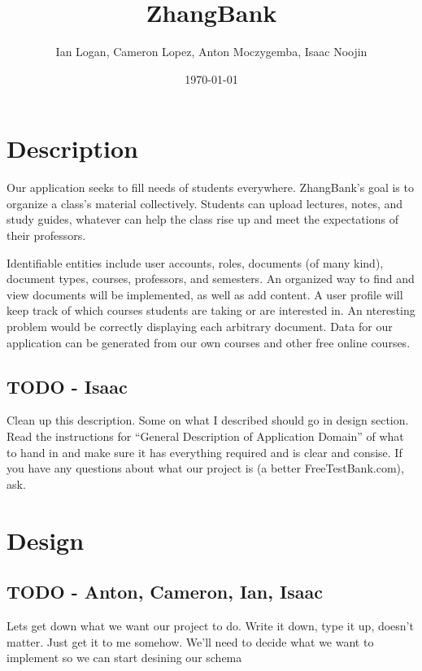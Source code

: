 \documentclass[11pt]{article}
\title{ZhangBank}
\author{Ian Logan, Cameron Lopez, Anton Moczygemba, Isaac Noojin}
\date{\today}
\begin{document}
\maketitle


\section*{Description}
\label{sec-1}


  Our application seeks to fill needs of students
  everywhere. ZhangBank's goal is to organize a class's material
  collectively. Students can upload lectures, notes, and study guides,
  whatever can help the class rise up and meet the expectations of
  their professors.

  Identifiable entities include user accounts, roles, documents (of
  many kind), document types, courses, professors, and semesters. An
  organized way to find and view documents will be implemented, as
  well as add content. A user profile will keep track of which courses
  students are taking or are interested in. An nteresting problem
  would be correctly displaying each arbitrary document. Data for our
  application can be generated from our own courses and other free
  online courses.
  
\subsection*{\textbf{TODO} - Isaac}
\label{sec-1-1}

   Clean up this description. Some on what I described should go in
   design section. Read the instructions for ``General Description of
   Application Domain'' of what to hand in and make sure it has
   everything required and is clear and consise. If you have any
   questions about what our project is (a better FreeTestBank.com),
   ask.
\section*{Design}
\label{sec-2}
\subsection*{\textbf{TODO} - Anton, Cameron, Ian, Isaac}
\label{sec-2-1}

   Lets get down what we want our project to do. Write it down, type
   it up, doesn't matter. Just get it to me somehow. We'll need to
   decide what we want to implement so we can start desining our
   schema
\end{document}
